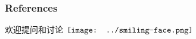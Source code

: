 \documentclass[16pt]{beamer}
\newcommand{\cc}[2]{#1}
\newcommand{\cc}[2]{#2}
\newcommand{\smiley}{$\vcenter{\hbox{\texttt{[image: ../smiling-face.png]}}}$}
\begin{document}
\begin{frame} %
\frametitle{References}
\cc{欢迎提问和讨论}{Questions, comments welcome} \smiley \\
\nocite{Goldblatt1984}
\nocite{MacLane1992}
\nocite{Streicher2006}
\nocite{Awodey2006}
\nocite{Jacobs1999}
\nocite{Abramsky2011}
\nocite{Caramello2018}
\nocite{Lawvere1997}
\nocite{Lawvere2003}
\nocite{Rodin2014}
\nocite{Vickers1989}
\nocite{Pitts1991}
\nocite{Sorensen2006}

\printbibliography
\end{frame}
\end{document}
